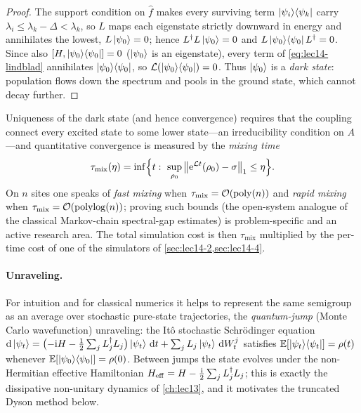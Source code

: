 \begin{proof}
The support condition on $\hat f$ makes every surviving term $\ket{\psi_i}\!\bra{\psi_k}$ carry
$\lambda_i\le\lambda_k-\Delta<\lambda_k$, so $L$ maps each eigenstate strictly downward in energy
and annihilates the lowest, $L\ket{\psi_0}=0$; hence $L^{\dagger} L\ket{\psi_0}=0$ and $L\ket{\psi_0}\!\bra{\psi_0}
L^{\dagger}=0$. Since also $[H,\ket{\psi_0}\!\bra{\psi_0}]=0$ ($\ket{\psi_0}$ is an eigenstate), every term of
\eqref{eq:lec14-lindblad} annihilates $\ket{\psi_0}\!\bra{\psi_0}$, so $\mathcal L(\ket{\psi_0}\!\bra{\psi_0})=0$. Thus
$\ket{\psi_0}$ is a \emph{dark state}: population flows down the spectrum and pools in the ground
state, which cannot decay further.
\end{proof}

Uniqueness of the dark state (and hence convergence) requires that the coupling connect every
excited state to some lower state---an irreducibility condition on $A$---and quantitative
convergence is measured by the \emph{mixing time}
\begin{equation}
  \tau_{\mathrm{mix}}(\eta)=\inf\Bigl\{t:\ \sup_{\rho_0}\norm{\ee^{\mathcal L t}(\rho_0)-\sigma}_1
    \le\eta\Bigr\}.
  \label{eq:lec14-mixing}
\end{equation}
On $n$ sites one speaks of \emph{fast mixing} when $\tau_{\mathrm{mix}}=\mathcal O(\operatorname{poly}(n))$ and
\emph{rapid mixing} when $\tau_{\mathrm{mix}}=\mathcal O(\operatorname{polylog}(n))$; proving such bounds (the
open-system analogue of the classical Markov-chain spectral-gap estimates) is problem-specific and
an active research area. The total simulation cost is then $\tau_{\mathrm{mix}}$ multiplied by the
per-time cost of one of the simulators of \cref{sec:lec14-2,sec:lec14-4}.

\paragraph{Unraveling.}
For intuition and for classical numerics it helps to represent the same semigroup as an average
over stochastic pure-state trajectories, the \emph{quantum-jump} (Monte Carlo wavefunction)
unraveling: the It\^o stochastic Schr\"odinger equation
$\mathrm{d}\ket{\psi_t}=\bigl(-\mathrm{i} H-\tfrac12\sum_j L_j^{\dagger} L_j\bigr)\ket{\psi_t}\,\mathrm{d} t+\sum_j L_j
\ket{\psi_t}\,\mathrm{d} W_t^j$ satisfies $\mathbb{E}[\ket{\psi_t}\!\bra{\psi_t}]=\rho(t)$ whenever $\mathbb{E}[\ket{\psi_0}\!\bra{\psi_0}]=\rho(0)$.
Between jumps the state evolves under the non-Hermitian effective Hamiltonian $H_{\mathrm{eff}}
=H-\tfrac{\mathrm{i}}2\sum_j L_j^{\dagger} L_j$; this is exactly the dissipative non-unitary dynamics of
\cref{ch:lec13}, and it motivates the truncated Dyson method below.

